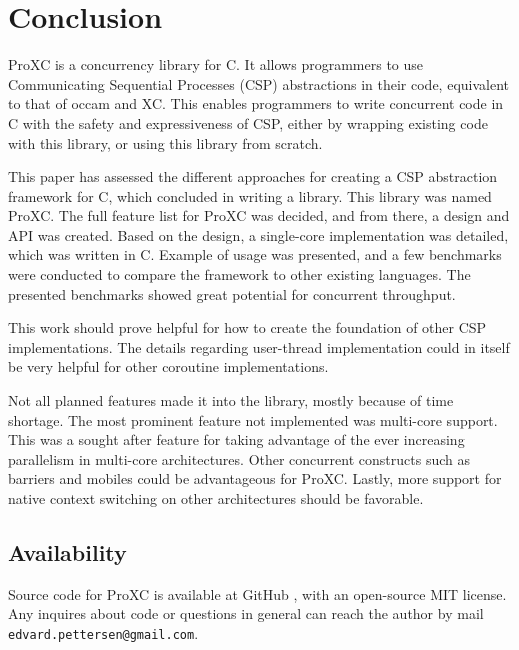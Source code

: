 
\chapter{Conclusion}
\label{ch:conclusion}

ProXC is a concurrency library for C. It allows programmers to use Communicating Sequential Processes (CSP) abstractions in their code, equivalent to that of occam and XC. This enables programmers to write concurrent code in C with the safety and expressiveness of CSP, either by wrapping existing code with this library, or using this library from scratch.

This paper has assessed the different approaches for creating a CSP abstraction framework for C, which concluded in writing a library. This library was named ProXC. The full feature list for ProXC was decided, and from there, a design and API was created. Based on the design, a single\hyp{}core implementation was detailed, which was written in C. Example of usage was presented, and a few benchmarks were conducted to compare the framework to other existing languages. The presented benchmarks showed great potential for concurrent throughput. 

This work should prove helpful for how to create the foundation of other CSP implementations. The details regarding user\hyp{}thread implementation could in itself be very helpful for other coroutine implementations. 

Not all planned features made it into the library, mostly because of time shortage. The most prominent feature not implemented was multi\hyp{}core support. This was a sought after feature for taking advantage of the ever increasing parallelism in multi\hyp{}core architectures. Other concurrent constructs such as barriers and mobiles could be advantageous for ProXC. Lastly, more support for native context switching on other architectures should be favorable.

\section{Availability}
\label{sec:availability}

Source code for ProXC is available at GitHub \citep{proxc_github}, with an open\hyp{}source MIT license. Any inquires about code or questions in general can reach the author by mail \texttt{edvard.pettersen@gmail.com}.

